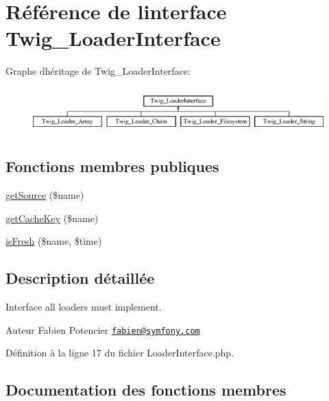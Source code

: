\hypertarget{interface_twig___loader_interface}{}\section{Référence de l\textquotesingle{}interface Twig\+\_\+\+Loader\+Interface}
\label{interface_twig___loader_interface}
Graphe d\textquotesingle{}héritage de Twig\+\_\+\+Loader\+Interface\+:\begin{figure}[H]
\begin{center}
\leavevmode
\includegraphics[height=1.761006cm]{interface_twig___loader_interface}
\end{center}
\end{figure}
\subsection*{Fonctions membres publiques}
\begin{DoxyCompactItemize}
\item 
\hyperlink{interface_twig___loader_interface_a8c6017d8ed0800a8d6b201883fcfb4bd}{get\+Source} (\$name)
\item 
\hyperlink{interface_twig___loader_interface_aaf1587bcc7c8f06e87be6ccaf76fb6ea}{get\+Cache\+Key} (\$name)
\item 
\hyperlink{interface_twig___loader_interface_a3ee0419b212dc4f6f1e8a5a615423ad8}{is\+Fresh} (\$name, \$time)
\end{DoxyCompactItemize}


\subsection{Description détaillée}
Interface all loaders must implement.

\begin{DoxyAuthor}{Auteur}
Fabien Potencier \href{mailto:fabien@symfony.com}{\tt fabien@symfony.\+com} 
\end{DoxyAuthor}


Définition à la ligne 17 du fichier Loader\+Interface.\+php.



\subsection{Documentation des fonctions membres}
